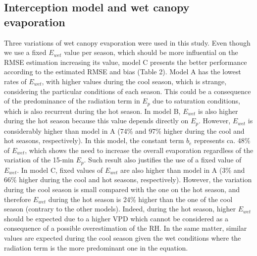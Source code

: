 \documentclass[a4paper,12pt]{article}
\begin{document}
\subsection{Interception model and wet canopy evaporation} \label{dis_evaporation}
Three variations of wet canopy evaporation were used in this study. Even though we use a fixed $E_{wet}$ value per season, which should be more influential on the RMSE estimation increasing its value, model C presents the better performance according to the estimated RMSE and bias (Table 2). Model A has the lowest rates of $E_{wet}$, with higher values during the cool season, which is strange, considering the particular conditions of each season. This could be a consequence of the predominance of the radiation term in $E_p$ due to saturation conditions, which is also recurrent during the hot season. In model B, $E_{wet}$ is also higher during the hot season because this value depends directly on $E_p$. However, $E_{wet}$ is considerably higher than model in A (74\% and 97\% higher during the cool and hot seasons, respectively). In this model, the constant term $b_e$ represents ca. 48\% of $E_{wet}$, which shows the need to increase the overall evaporation regardless of the variation of the 15-min $E_p$. Such result also justifies the use of a fixed value of $E_{wet}$. In model C, fixed values of $E_{wet}$ are also higher than model in A (3\% and 66\% higher during the cool and hot seasons, respectively). However, the variation during the cool season is small compared with the one on the hot season, and therefore $E_{wet}$ during the hot season is 24\% higher than the one of the cool season (contrary to the other models). Indeed, during the hot season, higher $E_{wet}$ should be expected due to a higher VPD which cannot be considered as a consequence of a possible overestimation of the RH. In the same matter, similar values are expected during the cool season given the wet conditions where the radiation term is the more predominant one in the equation. 

\end{document}
